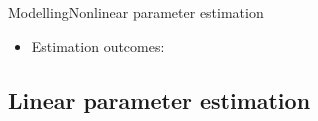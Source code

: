 \begin{frame}{Modelling}{Nonlinear parameter estimation}
\begin{itemize}
	\item<1-> Estimation outcomes: 	
\end{itemize}

\begin{figure}[H]
  \centering
  \begin{minipage}[b]{0.45\textwidth}
    
  \end{minipage}
  \hfill
  \begin{minipage}[b]{0.45\textwidth}
   
  \end{minipage}
\end{figure}
\end{frame}

\subsection{Linear parameter estimation}

